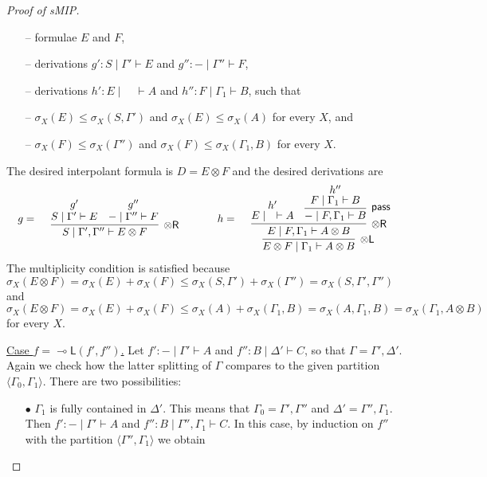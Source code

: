\documentclass[sn-mathphys-num]{sn-jnl}%
\newcommand{\GG}{\Gamma}
\newcommand{\vd}{\vdash}
\newcommand{\tl}{\otimes \mathsf{L}}
\newcommand{\tr}{\otimes\mathsf{R}}
\newcommand{\pass}{\mathsf{pass}}
\newcommand{\ot}{\otimes}
\newcommand{\lolli}{\multimap}
\newcommand{\lleft}{{\lolli}\mathsf{L}}
\newcommand{\proofbox}[1]{\begin{tabular}{l} #1 \end{tabular}}
\newcommand{\gs}[1]{\sigma_{X} (#1)}
\newcommand{\sMIP}{\textsf{sMIP}}
\theoremstyle{thmstyleone}%
\theoremstyle{thmstyletwo}%
\theoremstyle{thmstylethree}%
\begin{document}
\begin{proof}[Proof of \sMIP]
\begin{itemize}
\begin{itemize}
  \item[--] formulae $E$ and $F$,
\item[--] derivations $g' : S \mid \GG' \vd E$ and $g'' : {-} \mid \GG'' \vd F$,
\item[--] derivations $h' : E \mid \quad \vd A$ and $h'' : F \mid \GG_1 \vd B$, such that
\item[--] $\gs{E} \leq \gs{S, \GG'} $ and $ \gs{E} \leq \gs{A}$ for every $X$, and
  \item[--] $\gs{F} \leq \gs{\GG''} $ and $\gs{F} \leq \gs{\GG_1, B}$ for every $X$.
\end{itemize}
The desired interpolant formula is $D = E \ot F$ and the desired derivations are
\begin{displaymath}
  \begin{array}{c}
  \begin{array}{c}
    g
=
    \proofbox{\infer[\tr]{S \mid \GG' , \GG'' \vd E \ot F}{
      \deduce{S \mid \GG' \vd E}{g'}
      &
      \deduce{{-} \mid \GG'' \vd F}{g''}
    }}
  \end{array}
    \qquad
    \begin{array}{c}
      h
=
      \proofbox{\infer[\tl]{E \ot F \mid \GG_1 \vd A \ot B}{
      \infer[\tr]{E \mid F , \GG_1 \vd A \ot B}{
        \deduce{E \mid \quad \vd A}{h'}
        &
        \infer[\pass]{{-} \mid F , \GG_1 \vd B}{
          \deduce{F \mid \GG_1 \vd B}{h''}
        }
      }
    }}
    \end{array}
  \end{array}
\end{displaymath}
The multiplicity condition is satisfied because $\gs{E \ot F} = \gs{E} + \gs{F} \leq \gs{S , \GG'} + \gs{\GG''} = \gs{S, \GG' , \GG''}$ and $\gs{E \ot F} = \gs{E} + \gs{F} \leq \gs{A} + \gs{\GG_1 , B} = \gs{A, \GG_1 , B} = \gs{\GG_1, A \ot B}$ for every $X$.
\end{itemize}
\underline{Case $f = \lleft(f',f'')$.}
Let $f' : {-} \mid \Gamma' \vd A$ and $f'' : B \mid \Delta' \vd C$, so that $\GG = \GG',\Delta'$. 
Again we check how the latter splitting of $\GG$ compares to the given partition $\langle \GG_0,\GG_1 \rangle$. 
There are two possibilities:
\begin{itemize}
\item[$\bullet$]  $\Gamma_1$ is fully contained in $\Delta'$. 
This means that $\Gamma_0 = \Gamma',\GG''$ and $\Delta' = \GG'',\Gamma_1$.
Then $f' : {-} \mid \GG' \vd A$ and $f'' : B \mid \GG'' , \GG_1 \vd C$.
In this case, by induction on $f''$ with the partition $\langle \GG'' , \GG_1 \rangle$ we obtain

\end{itemize}
\end{proof}
\end{document}
